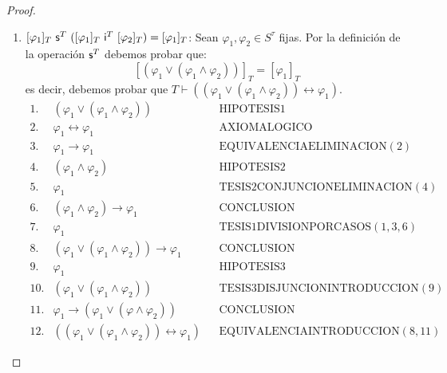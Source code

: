 \begin{proof}
\begin{enumerate}[(1)]
      \item $[\varphi_{1}]_{T} \ \SU^{T} \ ([\varphi_{1}]_{T} \ \IN^{T} \ [\varphi_{2}]_{T}) = [\varphi_{1}]_{T}$: Sean
        $\varphi_{1}, \varphi_{2} \in S^{\tau}$ fijas. Por la definición de la operación $\mathsf{s}^{T}$ debemos probar que:
        \[
          [(\varphi_{1} \vee (\varphi_{1} \wedge \varphi_{2}))]_{T} = [\varphi_{1}]_{T}
        \]
        \PN es decir, debemos probar que $T \vdash ((\varphi_{1} \vee (\varphi_{1} \wedge \varphi_{2})) \leftrightarrow
        \varphi_{1})$.
        \[
        \begin{array}{llll}
          1. & (\varphi_{1} \vee (\varphi_{1} \wedge \varphi_{2})) && \text{HIPOTESIS1} \\
          2. & \varphi_{1} \leftrightarrow \varphi_{1} && \text{AXIOMALOGICO} \\
          3. & \varphi_{1} \rightarrow \varphi_{1} && \text{EQUIVALENCIAELIMINACION}(2) \\
          4. & (\varphi_{1} \wedge \varphi_{2}) && \text{HIPOTESIS2} \\
          5. & \varphi_{1} && \text{TESIS2CONJUNCIONELIMINACION}(4) \\
          6. & (\varphi_{1} \wedge \varphi_{2}) \rightarrow \varphi_{1} && \text{CONCLUSION} \\
          7. & \varphi_{1} && \text{TESIS1DIVISIONPORCASOS}(1,3,6) \\
          8. & (\varphi_{1} \vee (\varphi_{1} \wedge \varphi_{2})) \rightarrow \varphi_{1} && \text{CONCLUSION} \\
          9. & \varphi_{1} && \text{HIPOTESIS3} \\
          10. & (\varphi_{1} \vee (\varphi_{1} \wedge \varphi_{2} )) && \text{TESIS3DISJUNCIONINTRODUCCION}(9) \\
          11. & \varphi_{1} \rightarrow (\varphi_{1} \vee (\varphi \wedge \varphi_{2})) && \text{CONCLUSION} \\
          12. & ((\varphi_{1} \vee (\varphi_{1} \wedge \varphi_{2})) \leftrightarrow \varphi_{1}) &&
            \text{EQUIVALENCIAINTRODUCCION}(8,11)
        \end{array}
        \]


\end{enumerate}
\end{proof}
